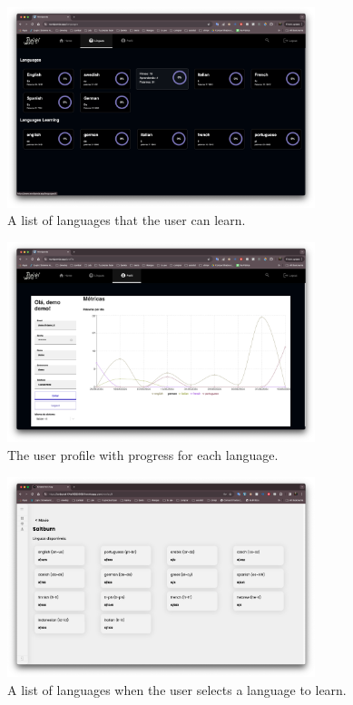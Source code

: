 \documentclass[12pt]{article}
\begin{document}
  \begin{figure}[!h]
    \centering
    \caption{
    A list of languages that the user can learn. 
    }
    \label{fig:site2}
    \includegraphics[width=0.8\textwidth]{assets/21.png}
  \end{figure}

    \begin{figure}[!h]
      \centering
      \caption{
      The user profile with progress for each language.
      }
      \label{fig:site3}
      \includegraphics[width=0.8\textwidth]{assets/22.png}
    \end{figure}

    \begin{figure}[!h]
      \centering
      \caption{
      A list of languages when the user selects a language to learn.
      }
      \label{fig:site4}
      \includegraphics[width=0.8\textwidth]{assets/25.png}
    \end{figure}
\end{document}

